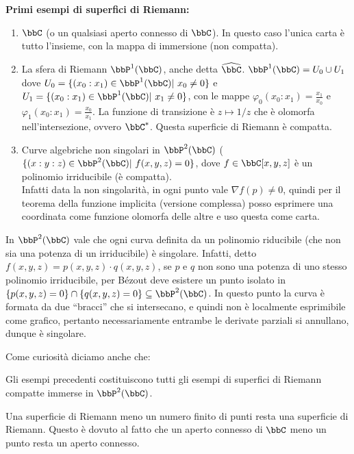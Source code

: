 \textbf{Primi esempi di superfici di Riemann:}
\begin{enumerate}
  \item $\bbC$ (o un qualsiasi aperto connesso di $\bbC$). In questo caso l'unica carta è tutto l'insieme, con la mappa di immersione (non compatta).
  \item La sfera di Riemann $\bbP^1(\bbC)$, anche detta $\hat\bbC$. $\bbP^1(\bbC)=U_0\cup U_1$ dove $U_0=\{(x_0:x_1)\in \bbP^1(\bbC) | \ x_0\neq 0\}$ e $U_1=\{(x_0:x_1)\in \bbP^1(\bbC) | \ x_1\neq 0\}$, con le mappe $\varphi_0(x_0:x_1)=\frac{x_1}{x_0}$ e $\varphi_1(x_0:x_1)=\frac{x_0}{x_1}$. La funzione di transizione è $z\mapsto 1/z$ che è olomorfa nell'intersezione, ovvero $\bbC^\ast$. Questa superficie di Riemann è compatta.
  \item Curve algebriche non singolari in $\bbP^2(\bbC)$ ($\{(x:y:z)\in \bbP^2(\bbC) | \ f(x,y,z)=0\}$, dove $f\in \bbC[x,y,z]$ è un polinomio irriducibile (è compatta).\\
  Infatti data la non singolarità, in ogni punto vale $\nabla f(p)\neq0$, quindi per il teorema della funzione implicita (versione complessa) posso esprimere una coordinata come funzione olomorfa delle altre e uso questa come carta.
\end{enumerate}
\begin{osservazione}
    In $\bbP^2(\bbC)$ vale che ogni curva definita da un polinomio riducibile (che non sia una potenza di un irriducibile) è singolare. Infatti, detto $f(x,y,z)=p(x,y,z)\cdot q(x,y,z)$, se $p$ e $q$ non sono una potenza di uno stesso polinomio irriducibile, per Bézout deve esistere un punto isolato in $\{p(x,y,z)=0\}\cap\{q(x,y,z)=0\}\subseteq \bbP^2(\bbC)$. In questo punto la curva è formata da due ``bracci'' che si intersecano, e quindi non è localmente esprimibile come grafico, pertanto necessariamente entrambe le derivate parziali si annullano, dunque è singolare. %
\end{osservazione}

Come curiosità diciamo anche che:
\begin{divagazione}[di Chow]
    Gli esempi precedenti costituiscono tutti gli esempi di superfici di Riemann compatte immerse in $\bbP^2(\bbC)$.
\end{divagazione}
\begin{osservazione}
    Una superficie di Riemann meno un numero finito di punti resta una superficie di Riemann. Questo è dovuto al fatto che un aperto connesso di $\bbC$ meno un punto resta un aperto connesso.
\end{osservazione}


